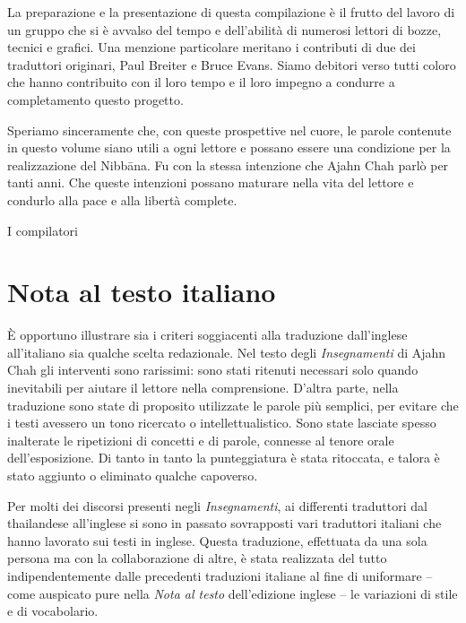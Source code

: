La preparazione e la presentazione di questa compilazione è il frutto
del lavoro di un gruppo che si è avvalso del tempo e dell'abilità di
numerosi lettori di bozze, tecnici e grafici. Una menzione particolare
meritano i contributi di due dei traduttori originari, Paul Breiter e
Bruce Evans. Siamo debitori verso tutti coloro che hanno contribuito con
il loro tempo e il loro impegno a condurre a completamento questo
progetto.

Speriamo sinceramente che, con queste prospettive nel cuore, le parole
contenute in questo volume siano utili a ogni lettore e possano essere
una condizione per la realizzazione del Nibbāna. Fu con la stessa
intenzione che Ajahn Chah parlò per tanti anni. Che queste intenzioni
possano maturare nella vita del lettore e condurlo alla pace e alla
libertà complete.

\bigskip

{\raggedleft
  I compilatori
\par}

\section{Nota al testo italiano}

È opportuno illustrare sia i criteri soggiacenti alla traduzione
dall'inglese all'italiano sia qualche scelta redazionale. Nel testo
degli \emph{Insegnamenti} di Ajahn Chah gli interventi sono rarissimi:
sono stati ritenuti necessari solo quando inevitabili per aiutare il
lettore nella comprensione. D'altra parte, nella traduzione sono state
di proposito utilizzate le parole più semplici, per evitare che i testi
avessero un tono ricercato o intellettualistico. Sono state lasciate
spesso inalterate le ripetizioni di concetti e di parole, connesse al
tenore orale dell'esposizione. Di tanto in tanto la punteggiatura è
stata ritoccata, e talora è stato aggiunto o eliminato qualche
capoverso.

Per molti dei discorsi presenti negli \emph{Insegnamenti}, ai differenti
traduttori dal thailandese all'inglese si sono in passato sovrapposti
vari traduttori italiani che hanno lavorato sui testi in inglese. Questa
traduzione, effettuata da una sola persona ma con la collaborazione di
altre, è stata realizzata del tutto indipendentemente dalle precedenti
traduzioni italiane al fine di uniformare -- come auspicato pure nella
\emph{Nota al testo} dell'edizione inglese -- le variazioni di stile e
di vocabolario.


